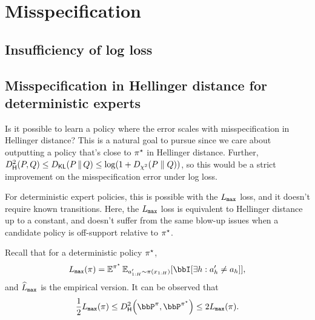 \section{Misspecification} 
\begin{comment}
  Plan: 
  - Starting point: TV distance with $f$-divergence (bounds incomparable in general) 
  - Closed form of optimal discriminator g 
  - Algo (discriminator class induced by function class itself?) 
  - Slow rate guarantee 
  - Why Hellinger doesn't work    
\end{comment}

\subsection{Insufficiency of log loss}

\subsection{Misspecification in Hellinger distance for deterministic experts} 
Is it possible to learn a policy where the error scales with misspecification in Hellinger distance? This is a natural goal to pursue since we care about outputting a policy that's close to $\pi^{\star}$ in Hellinger distance. Further, $\Dhels{P}{Q} \le \Dkl{P}{Q} \le \log(1+\Dchis{P}{Q})$, so this would be a strict improvement on the misspecification error under log loss.  

For deterministic expert policies, this is possible with the $L_{\texttt{max}}$ loss, and it doesn't require known transitions. Here, the $L_{\texttt{max}}$ loss is equivalent to Hellinger distance up to a constant, and doesn't suffer from the same blow-up issues when a candidate policy is off-support relative to $\pi^{\star}$.    

Recall that for a deterministic policy $\pi^{\star}$,
\begin{align*}
  \Lmax(\pi) = \En^{\pistar}\En_{a'_{1:H}\sim\pi(x_{1:H})}\sbr*{\bbI\sbr*{\exists h : a'_h \neq a_h}},
\end{align*}
and $\widehat{L}_{\texttt{max}}$ is the empirical version. It can be observed that 
\begin{align*}
  \frac{1}{2}\Lmax(\pi) \le \Dhels{\bbP^\pi}{\bbP^{\pistar}} \le 2\Lmax(\pi). 
\end{align*}


